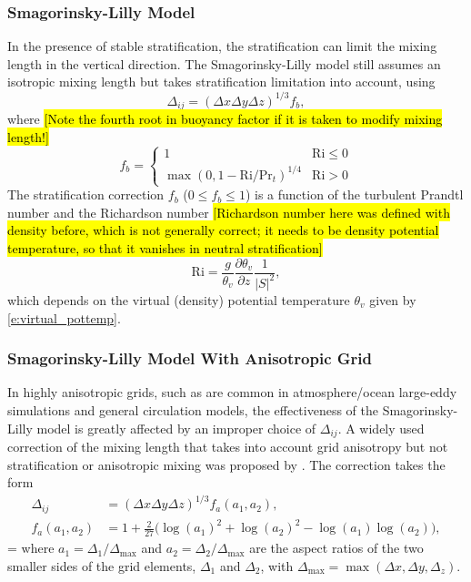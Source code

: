 \documentclass{article}
\begin{document}
\subsubsection{Smagorinsky-Lilly Model}

In the presence of stable stratification, the stratification can limit the mixing length  in the vertical direction. The Smagorinsky-Lilly model \citep{smagorinsky:1963, lilly:1962} still assumes an isotropic mixing length  but takes stratification limitation into account, using 
\begin{equation}\label{eq:smag-lilly}
\Delta_{ij} = (\Delta x \Delta y \Delta z)^{1/3} f_{b},   
\end{equation}
where \hl{[Note the fourth root in buoyancy factor if it is taken to modify mixing length!]}
\begin{equation}\label{eq:Lilly_strat}
f_{b} = 
    \begin{cases}
    1 & \mathrm{Ri} \leq 0 \\
    \max(0, 1 - \mathrm{Ri} / \mathrm{Pr}_{t})^{1/4} & \mathrm{Ri} > 0 
    \end{cases}
\end{equation}
The stratification correction $f_{b}$ ($0 \leq f_b \leq 1$) is a function of the turbulent Prandtl number  and the Richardson number 
\hl{[Richardson number here was defined with density before, which is not generally correct; it needs to be density potential temperature, so that it vanishes in neutral stratification]}
\[
\mathrm{Ri} = \frac{g}{\theta_v} \frac{\partial \theta_v}{\partial z} \frac{1}{{|S|}^2},
\]
which depends on the virtual (density) potential temperature $\theta_v$ given by \eqref{e:virtual_pottemp}.
 
\subsubsection{Smagorinsky-Lilly Model With Anisotropic Grid}
 
In highly anisotropic grids, such as are common in atmosphere/ocean large-eddy simulations and general circulation models, the effectiveness of the Smagorinsky-Lilly model is greatly affected by an improper choice of $\Delta_{ij}$. A widely used correction of the mixing length that takes into account grid anisotropy but not stratification or anisotropic mixing was proposed by  \citet{scottiMeneveauLilly1993}. The correction takes the form
\begin{align}
\Delta_{ij} &= (\Delta x \Delta y \Delta z)^{1/3} f_{a}(a_1, a_2),   \\
f_a(a_1, a_2) &= 1+\frac{2}{27}\Big(\log(a_{1})^2 + \log(a_2)^2 -\log(a_1)\log(a_2)\Big),
\end{align}=
where  $a_1 =  \Delta_1/\Delta_{\max}$ and $a_2 = \Delta_2/\Delta_{\max}$ are the aspect ratios of the two smaller sides of the grid elements, $\Delta_1$ and $\Delta_2$, with $\Delta_{\max} = \max(\Delta x, \Delta y, \Delta_z)$. 
\end{document}
